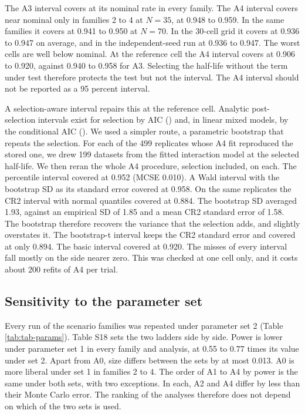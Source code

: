 \documentclass[
  11pt,
]{article}
\begin{document}
The A3 interval covers at its nominal rate in every family. The A4
interval covers near nominal only in families 2 to 4 at \(N = 35\), at
0.948 to 0.959.
In the same families it covers at 0.941 to
0.950 at \(N = 70\). In the 30-cell grid
it covers at 0.936 to
0.947 on average, and in the
independent-seed run at 0.936 to
0.947. The worst cells are well below
nominal. At the reference cell the A4 interval covers at
0.906 to
0.920, against
0.940 to
0.958 for A3.
Selecting the half-life without the term under test therefore
protects the test but not the interval. The A4 interval should not be
reported as a 95 percent interval.

A selection-aware interval repairs this at the reference cell.
Analytic post-selection intervals exist for selection by AIC
() and, in linear mixed models, by the conditional AIC
(). We used a simpler route, a parametric bootstrap
that repeats the selection. For each of the 499 replicates
whose A4 fit reproduced the stored one, we drew 199 datasets from the
fitted interaction model at the selected half-life. We then reran the
whole A4 procedure, selection included, on each. The percentile
interval covered at 0.952 (MCSE
0.010). A Wald interval with the
bootstrap SD as its standard error covered at
0.958. On the same replicates the CR2 interval with
normal quantiles covered at 0.884. The bootstrap
SD averaged 1.93, against an
empirical SD of 1.85 and a mean CR2
standard error of 1.58. The bootstrap
therefore recovers the variance that the selection adds, and slightly
overstates it. The bootstrap-t interval keeps the CR2 standard error
and covered at only 0.894. The basic interval covered
at
0.920. The misses of every interval fall mostly on
the side nearer zero. This was checked at one cell only, and it costs
about 200 refits of A4 per trial.

\subsection{Sensitivity to the parameter set}\label{sec-sens-params}

Every run of the scenario families was repeated under parameter set 2
(Table \ref{tab:tab-params}). Table S18 sets the two ladders side by
side. Power is lower under parameter set 1 in every family and
analysis, at
0.55 to 0.77 times
its value under set 2. Apart from A0, size differs between the sets by
at most 0.013. A0 is more liberal under set
1 in families 2 to 4. The order of A1 to A4 by power is the same under
both sets, with two exceptions. In each, A2 and A4 differ by less
than their Monte Carlo error. The ranking of the analyses therefore does
not depend on which of the two sets is used.
\end{document}
